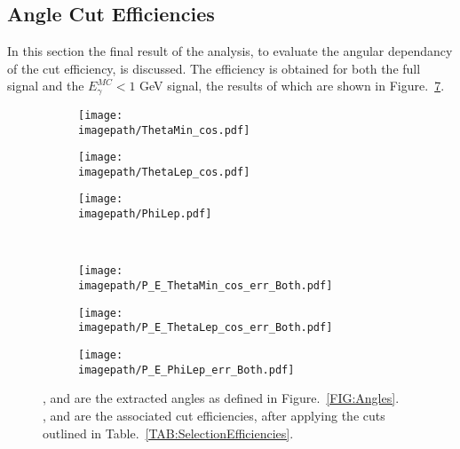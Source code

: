 \subsection{Angle Cut Efficiencies}
\label{SUBSEC:AngleCutEfficiencies}
In this section the final result of the analysis, to evaluate the angular dependancy of the cut efficiency, is discussed. The efficiency is obtained for both the full signal and the ${E}_{\gamma}^{MC} < 1$ GeV signal, the results of which are shown in Figure.~\ref{FIG:AngleEfficiencies}.
\\
\begin{figure}
    \begin{subfigure}[t]{0.32\textwidth}
        \texttt{[image: \\imagepath/ThetaMin\_cos.pdf]}
        \caption{}
        \label{SUBFIG:ThetaMin}
    \end{subfigure}
    \begin{subfigure}[t]{0.32\textwidth}
        \texttt{[image: \\imagepath/ThetaLep\_cos.pdf]}
        \caption{}
        \label{SUBFIG:ThetaLep}
    \end{subfigure}
    \begin{subfigure}[t]{0.32\textwidth}
        \texttt{[image: \\imagepath/PhiLep.pdf]}
        \caption{}
        \label{SUBFIG:PhiLep}
    \end{subfigure}\\
    \begin{subfigure}[t]{0.32\textwidth}
        \texttt{[image: \\imagepath/P\_E\_ThetaMin\_cos\_err\_Both.pdf]}
        \caption{}
        \label{SUBFIG:ThetaMinError}
    \end{subfigure}
    \begin{subfigure}[t]{0.32\textwidth}
        \texttt{[image: \\imagepath/P\_E\_ThetaLep\_cos\_err\_Both.pdf]}
        \caption{}
        \label{SUBFIG:ThetaLepError}
    \end{subfigure}
    \begin{subfigure}[t]{0.32\textwidth}
        \texttt{[image: \\imagepath/P\_E\_PhiLep\_err\_Both.pdf]}
        \caption{}
        \label{SUBFIG:PhiLepError}
    \end{subfigure}
    \caption{
    ,  and  are the extracted angles as defined in Figure.~\ref{FIG:Angles}. \\
    ,  and  are the associated cut efficiencies, after applying the cuts outlined in Table.~\ref{TAB:SelectionEfficiencies}.
    }
    \label{FIG:AngleEfficiencies}
\end{figure}

